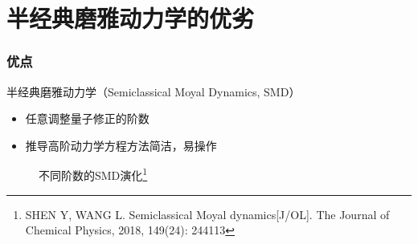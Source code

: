 \documentclass{beamer}
\begin{document}
\section{半经典磨雅动力学的优劣}
\begin{frame}[t]\frametitle{优点}
半经典磨雅动力学（Semiclassical Moyal Dynamics, SMD）
\begin{itemize}
	\item 任意调整量子修正的阶数
	\item 推导高阶动力学方程方法简洁，易操作
\end{itemize}
\begin{figure}
\centering
{}
\caption{不同阶数的SMD演化\footnote{\tiny SHEN Y, WANG L. Semiclassical Moyal dynamics[J/OL]. The Journal of Chem­ical Physics, 2018, 149(24): 244113}}
\end{figure}
\end{frame}
\end{document}

